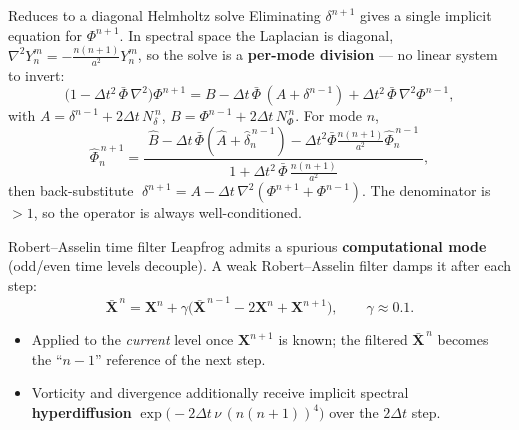 \documentclass{beamer}
\begin{document}
\begin{frame}{Reduces to a diagonal Helmholtz solve}
    Eliminating $\delta^{n+1}$ gives a single implicit equation for $\Phi^{n+1}$. In spectral space
    the Laplacian is diagonal, $\nabla^2 Y_n^m = -\tfrac{n(n+1)}{a^2}Y_n^m$, so the solve is a
    \textbf{per-mode division} --- no linear system to invert:
    \begin{equation}
        \Big(1-\Delta t^2\,\bar\Phi\,\nabla^2\Big)\Phi^{n+1}
        = B - \Delta t\,\bar\Phi\,(A+\delta^{n-1}) + \Delta t^2\,\bar\Phi\,\nabla^2\Phi^{n-1},
    \end{equation}
    with $A=\delta^{n-1}+2\Delta t\,N_\delta^{\,n}$, $B=\Phi^{n-1}+2\Delta t\,N_\Phi^{\,n}$. For mode $n$,
    \begin{equation}
        \widehat\Phi_n^{\,n+1}
        = \frac{\;\widehat B - \Delta t\,\bar\Phi(\widehat A+\widehat\delta_n^{\,n-1})
                 - \Delta t^2\bar\Phi\tfrac{n(n+1)}{a^2}\widehat\Phi_n^{\,n-1}\;}
               {\,1+\Delta t^2\,\bar\Phi\,\tfrac{n(n+1)}{a^2}\,},
    \end{equation}
    then back-substitute $\;\delta^{n+1}=A-\Delta t\,\nabla^2(\Phi^{n+1}+\Phi^{n-1})$.
    The denominator is $>1$, so the operator is always well-conditioned.
\end{frame}

\begin{frame}{Robert--Asselin time filter}
    Leapfrog admits a spurious \textbf{computational mode} (odd/even time levels decouple). A weak
    Robert--Asselin filter damps it after each step:
    \begin{equation}
        \bar{\mathbf X}^{\,n} = \mathbf X^{n}
        + \gamma\big(\bar{\mathbf X}^{\,n-1} - 2\mathbf X^{n} + \mathbf X^{n+1}\big),
        \qquad \gamma \approx 0.1 .
    \end{equation}
    \begin{itemize}
        \item Applied to the \emph{current} level once $\mathbf X^{n+1}$ is known; the filtered
        $\bar{\mathbf X}^{\,n}$ becomes the ``$n{-}1$'' reference of the next step.
        \item Vorticity and divergence additionally receive implicit spectral
        \textbf{hyperdiffusion} $\exp\!\big(-2\Delta t\,\nu\,(n(n{+}1))^4\big)$ over the $2\Delta t$ step.
    \end{itemize}
\end{frame}
\end{document}
